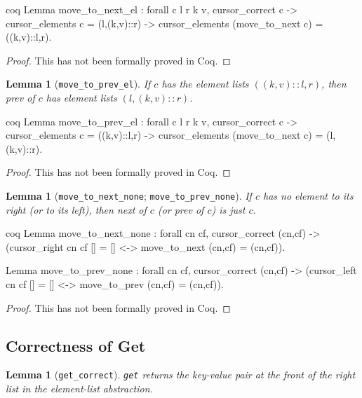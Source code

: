 \documentclass[12pt]{article}
\newtheorem{lemma}[theorem]{Lemma}
\newcommand{\nocontentsline}[3]{}
\newcommand{\tocless}[2]{\bgroup\let\addcontentsline=\nocontentsline#1{#2}\egroup}
\begin{document}
\begin{appendices}
\begin{singlespace}
\begin{cminted}{coq}
Lemma move_to_next_el : forall c l r k v,
  cursor_correct c ->
  cursor_elements c = (l,(k,v)::r) ->
  cursor_elements (move_to_next c) = ((k,v)::l,r).
\end{cminted}

\begin{proof}
This has not been formally proved in Coq.
\end{proof}

\begin{lemma}[\texttt{move\_to\_prev\_el}]
If $c$ has the element lists $((k,v)::l,r)$, then prev of $c$ has element lists $(l,(k,v)::r)$.
\end{lemma}

\begin{cminted}{coq}
Lemma move_to_prev_el : forall c l r k v,
  cursor_correct c ->
  cursor_elements c = ((k,v)::l,r) ->
  cursor_elements (move_to_next c) = (l,(k,v)::r).
\end{cminted}

\begin{proof}
This has not been formally proved in Coq.
\end{proof}

\begin{lemma}[\texttt{move\_to\_next\_none}; \texttt{move\_to\_prev\_none}]
If $c$ has no element to its right (or to its left), then next of $c$ (or prev of $c$) is just $c$.
\end{lemma}

\begin{cminted}{coq}
Lemma move_to_next_none : forall cn cf,
  cursor_correct (cn,cf) ->
  (cursor_right cn cf [] = [] <-> move_to_next (cn,cf) = (cn,cf)).

Lemma move_to_prev_none : forall cn cf,
  cursor_correct (cn,cf) ->
  (cursor_left cn cf [] = [] <-> move_to_prev (cn,cf) = (cn,cf)).
\end{cminted}

\begin{proof}
This has not been formally proved in Coq.
\end{proof}

\tocless\subsection{Correctness of Get}

\begin{lemma}[\texttt{get\_correct}]
\texttt{get} returns the key-value pair at the front of the right list in the element-list abstraction.
\end{lemma}


\end{singlespace}
\end{appendices}
\end{document}
